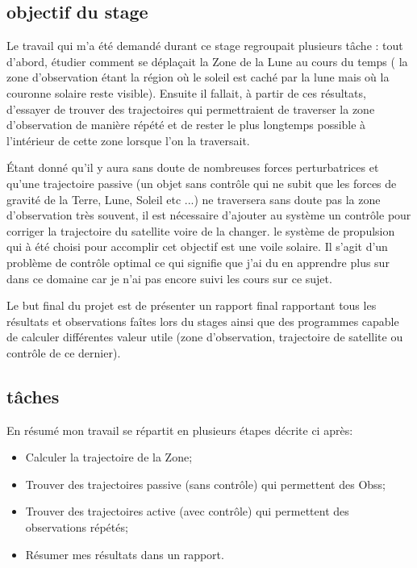 \documentclass[12pt]{article} %
\begin{document}
		\subsection{objectif du stage}
		Le travail qui m'a été demandé durant ce stage regroupait plusieurs tâche : tout d'abord, étudier comment se déplaçait la \gls{Zone} de la Lune au cours du temps ( la zone d'observation étant la région où le soleil est caché par la lune mais où la couronne solaire reste visible). Ensuite il fallait, à partir de ces résultats, d'essayer de trouver des trajectoires qui permettraient de traverser la zone d'observation de manière répété et de rester le plus longtemps possible à l'intérieur de cette zone lorsque l'on la traversait.
		
		Étant donné qu'il y aura sans doute de nombreuses forces perturbatrices et qu'une trajectoire passive (un objet sans contrôle qui ne subit que les forces de gravité de la Terre, Lune, Soleil etc ...) ne traversera sans doute pas la zone d'observation très souvent, il est nécessaire d'ajouter au système un contrôle pour corriger la trajectoire du satellite voire de la changer. le système de propulsion qui à été choisi pour accomplir cet objectif est une voile solaire. Il s'agit d'un problème de contrôle optimal ce qui signifie que j'ai du en apprendre plus sur dans ce domaine car je n'ai pas encore suivi les cours sur ce sujet.
		
		Le but final du projet est de présenter un rapport final rapportant tous les résultats et observations faîtes lors du stages ainsi que des programmes capable de calculer différentes valeur utile (zone d'observation, trajectoire de satellite ou contrôle de ce dernier).
		
		\subsection{tâches}
		En résumé mon travail se répartit en plusieurs étapes décrite ci après:
		\begin{itemize}
			\item Calculer la trajectoire de la \gls{Zone};
			\item Trouver des trajectoires passive (sans contrôle) qui permettent des \glspl{Obs};
			\item Trouver des trajectoires active (avec contrôle) qui permettent des observations répétés;
			\item Résumer mes résultats dans un rapport.
		\end{itemize}
		
\end{document}
